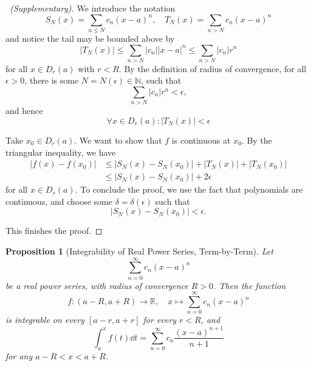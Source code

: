 \documentclass[11pt]{article}
\numberwithin{equation}{section}
\newtheorem{proposition}[theorem]{Proposition}
\theoremstyle{definition}
\theoremstyle{remark}
\newcommand{\pqty}[1]{\left(#1\right)}
\newcommand{\abs}[1]{\left|#1\right|}
\newcommand{\ccintv}[2]{[#1,#2]}
\newcommand{\oointv}[2]{(#1,#2)}
\newcommand{\function}[5]{#1:#2\to #3,\quad #4\mapsto #5}
\newcommand{\RR}{\mathbb R}
\newcommand{\NN}{\mathbb N}
\begin{document}
\begin{proof}[\proofname\ (Supplementary)]
    We introduce the notation
    \[
        S_N\pqty{x} = \sum_{n \leq N} c_n \pqty{x - a}^n, \quad T_N\pqty{x} = \sum_{n > N} c_n \pqty{x - a}^n
    \]
    and notice the tail may be bounded above by
    \[
        \abs{T_N\pqty{x}} \leq \sum_{n > N} \abs{c_n} \abs{x - a}^n \leq \sum_{n > N} \abs{c_n} r^n
    \]
    for all \(x \in D_r\pqty{a}\) with \(r < R\). By the definition of radius of convergence, for all \(\epsilon > 0\), there is some \(N = N \pqty{\epsilon} \in \NN\), such that
    \[
        \sum_{n > N} \abs{c_n} r^n < \epsilon,
    \]
    and hence
    \[
        \forall x \in D_r\pqty{a}: \abs{T_N\pqty{x}} < \epsilon
    \]

    Take \(x_0 \in D_r\pqty{a}\). We want to show that \(f\) is continuous at \(x_0\). By the triangular inequality, we have
    \begin{align*}
        \abs{f\pqty{x} - f\pqty{x_0}} &\leq \abs{S_N\pqty{x} - S_N\pqty{x_0}} + \abs{T_N\pqty{x}} + \abs{T_N \pqty{x_0}} \\
        &\leq \abs{S_N\pqty{x} - S_N\pqty{x_0}} + 2 \epsilon
    \end{align*}
    for all \(x \in D_r\pqty{a}\). To conclude the proof, we use the fact that polynomials are continuous, and choose some \(\delta = \delta\pqty{\epsilon}\) such that
    \[
        \abs{S_N\pqty{x} - S_N\pqty{x_0}} < \epsilon.
    \]

    This finishes the proof.
\end{proof}

\begin{proposition}[Integrability of Real Power Series, Term-by-Term]\label{analysis-unit-0214}
    \label{prop:integrability-of-power-series-term-by-term}%
    Let
    \[
        \sum_{n = 0}^{\infty} c_n \pqty{x - a}^n
    \]
    be a real power series, with radius of convergence \(R > 0\). Then the function
    \[
        \function{f}{\oointv{a - R}{a + R}}{\RR}{x}{\sum_{n = 0}^{\infty} c_n \pqty{x - a}^n}  
    \]
    is integrable on every \(\ccintv{a - r}{a + r}\) for every \(r < R\), and
    \[
        \int_{a}^{x} f\pqty{t} \dd{t} = \sum_{n = 0}^{\infty} c_n \frac{\pqty{x - a}^{n + 1}}{n + 1}
    \]
    for any \(a - R < x < a + R\).
\end{proposition}
\end{document}
